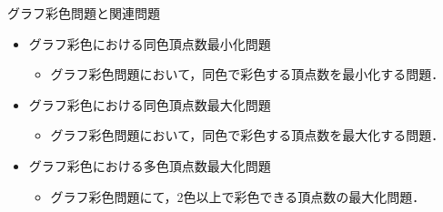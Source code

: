 \documentclass[dvipdfmx,11pt]{beamer}
\begin{document}
\begin{frame}{グラフ彩色問題と関連問題}
 \begin{itemize}
  \item \alert{グラフ彩色における同色頂点数最小化問題}
        \begin{itemize}
         \item グラフ彩色問題において，同色で彩色する頂点数を最小化する問題．
        \end{itemize}
  \item \alert{グラフ彩色における同色頂点数最大化問題}
        \begin{itemize}
         \item グラフ彩色問題において，同色で彩色する頂点数を最大化する問題．
        \end{itemize}
  \item \alert{グラフ彩色における多色頂点数最大化問題}
        \begin{itemize}
         \item グラフ彩色問題にて，2色以上で彩色できる頂点数の最大化問題．
        \end{itemize}

 \end{itemize}
 
\end{frame}
\end{document}
